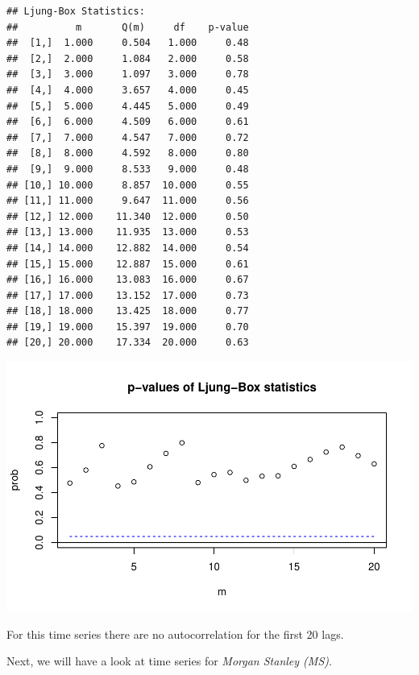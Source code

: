 \documentclass[12pt,a4paper]{article}
\newenvironment{Shaded}{\begin{snugshade}}{\end{snugshade}}
\newcommand{\DataTypeTok}[1]{\textcolor[rgb]{0.13,0.29,0.53}{#1}}
\newcommand{\DecValTok}[1]{\textcolor[rgb]{0.00,0.00,0.81}{#1}}
\newcommand{\KeywordTok}[1]{\textcolor[rgb]{0.13,0.29,0.53}{\textbf{#1}}}
\newcommand{\NormalTok}[1]{#1}
\newcommand{\OperatorTok}[1]{\textcolor[rgb]{0.81,0.36,0.00}{\textbf{#1}}}
\begin{document}
\begin{verbatim}
## Ljung-Box Statistics:  
##          m       Q(m)     df    p-value
##  [1,]  1.000     0.504   1.000     0.48
##  [2,]  2.000     1.084   2.000     0.58
##  [3,]  3.000     1.097   3.000     0.78
##  [4,]  4.000     3.657   4.000     0.45
##  [5,]  5.000     4.445   5.000     0.49
##  [6,]  6.000     4.509   6.000     0.61
##  [7,]  7.000     4.547   7.000     0.72
##  [8,]  8.000     4.592   8.000     0.80
##  [9,]  9.000     8.533   9.000     0.48
## [10,] 10.000     8.857  10.000     0.55
## [11,] 11.000     9.647  11.000     0.56
## [12,] 12.000    11.340  12.000     0.50
## [13,] 13.000    11.935  13.000     0.53
## [14,] 14.000    12.882  14.000     0.54
## [15,] 15.000    12.887  15.000     0.61
## [16,] 16.000    13.083  16.000     0.67
## [17,] 17.000    13.152  17.000     0.73
## [18,] 18.000    13.425  18.000     0.77
## [19,] 19.000    15.397  19.000     0.70
## [20,] 20.000    17.334  20.000     0.63
\end{verbatim}

\includegraphics{exercise_1_files/figure-latex/unnamed-chunk-3-1.pdf}

\FloatBarrier

For this time series there are no autocorrelation for the first 20 lags.

Next, we will have a look at time series for \emph{Morgan Stanley (MS)}.
\FloatBarrier

\begin{Shaded}
\end{Shaded}
\end{document}
